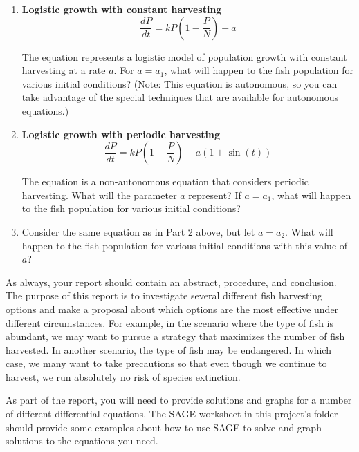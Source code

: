 \documentclass
[justified,nohyper]
{tufte-handout}
\begin{document}
\begin{enumerate}
    \item \textbf{Logistic growth with constant harvesting}
    \[
        \displaystyle\frac{dP}{dt}=kP\left(1-\displaystyle\frac{P}{N}\right) - a
    \]

The equation represents a logistic model of population growth with constant harvesting at 
a rate $a$. For $a=a_1$, 
what will happen to the fish population for various initial conditions? (Note: This equation is 
autonomous, so you can take advantage of the special techniques that are available for autonomous 
equations.)

    \item \textbf{Logistic growth with periodic harvesting}
    \[
        \displaystyle\frac{dP}{dt}= kP\left(1-\displaystyle\frac{P}{N}\right)
            - a\left(1+\sin\left(t\right)\right)
    \]

The equation is a non-autonomous equation that considers periodic harvesting. What will
the parameter $a$ represent? If $a=a_1$, what will happen to the
fish population for various initial conditions?

\item Consider the same equation as in Part 2 above, but let $a=a_2$. What will happen 
to the fish population for various initial conditions with this value of $a$?

\end{enumerate}

As always, your report should contain an abstract, procedure, and conclusion. The purpose of this
report is to investigate several different fish harvesting options and make a proposal about which
options are the most effective under different circumstances. For example, in the scenario where
the type of fish is abundant, we may want to pursue a strategy that maximizes the number of fish
harvested. In another scenario, the type of fish may be endangered. In which case, we many want to 
take precautions so that even though we continue to harvest, we run absolutely no risk of
species extinction.

As part of the report, you will need to provide solutions and graphs for a number of different
differential equations. The SAGE worksheet in this project's folder should provide some examples
about how to use SAGE to solve and graph solutions to the equations you need.
\end{document}
